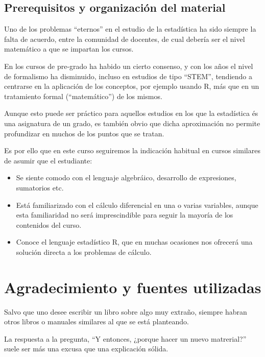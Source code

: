 \documentclass[
]{article}
\providecommand{\tightlist}{%
  \setlength{\itemsep}{0pt}\setlength{\parskip}{0pt}}
\begin{document}
\subsection*{Prerequisitos y organización del material}\label{prerequisitos-y-organizaciuxf3n-del-material}

Uno de los problemas ``eternos'' en el estudio de la estadística ha sido siempre la falta de acuerdo, entre la comunidad de docentes, de cual debería ser el nivel matemático a que se impartan los cursos.

En los cursos de pre-grado ha habido un cierto consenso, y con los años el nivel de formalismo ha disminuido, incluso en estudios de tipo ``STEM'', tendiendo a centrarse en la aplicación de los conceptos, por ejemplo usando R, más que en un tratamiento formal (``matemático'') de los mismos.

Aunque esto puede ser práctico para aquellos estudios en los que la estadística és una asignatura de un grado, es también obvio que dicha aproximación no permite profundizar en muchos de los puntos que se tratan.

Es por ello que en este curso seguiremos la indicación habitual en cursos similares de asumir que el estudiante:

\begin{itemize}
\tightlist
\item
  Se siente comodo con el lenguaje algebráico, desarrollo de expresiones, sumatorios etc.
\item
  Está familiarizado con el cálculo diferencial en una o varias variables, aunque esta familiaridad no será imprescindible para seguir la mayoría de los contenidos del curso.
\item
  Conoce el lenguaje estadístico R, que en muchas ocasiones nos ofrecerá una solución directa a los problemas de cálculo.
\end{itemize}

\section*{Agradecimiento y fuentes utilizadas}\label{agradecimiento-y-fuentes-utilizadas}

Salvo que uno desee escribir un libro sobre algo muy extraño, siempre habran otros libros o manuales similares al que se está planteando.

La respuesta a la pregunta, ``Y entonces, ¿porque hacer un nuevo matrerial?'' suele ser más una excusa que una explicación sólida.
\end{document}
